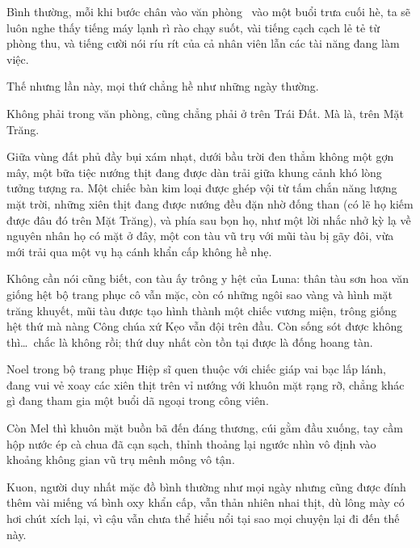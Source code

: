 \documentclass[../main.tex]{subfiles}
\begin{document}

Bình thường, mỗi khi bước chân vào văn phòng \hll\ vào một buổi trưa cuối hè, ta sẽ luôn nghe thấy tiếng máy lạnh rì rào chạy suốt, vài tiếng cạch cạch lẻ tẻ từ phòng thu, và tiếng cười nói ríu rít của cả nhân viên lẫn các tài năng đang làm việc.

Thế nhưng lần này, mọi thứ chẳng hề như những ngày thường.

Không phải trong văn phòng, cũng chẳng phải ở trên Trái Đất. Mà là, trên Mặt Trăng.

Giữa vùng đất phủ đầy bụi xám nhạt, dưới bầu trời đen thẳm không một gợn mây, một bữa tiệc nướng thịt đang được dàn trải giữa khung cảnh khó lòng tưởng tượng ra. Một chiếc bàn kim loại được ghép vội từ tấm chắn năng lượng mặt trời, những xiên thịt đang được nướng đều đặn nhờ đống than (có lẽ họ kiếm được đâu đó trên Mặt Trăng), và phía sau bọn họ, như một lời nhắc nhở kỳ lạ về nguyên nhân họ có mặt ở đây, một con tàu vũ trụ với mũi tàu bị gãy đôi, vừa mới trải qua một vụ hạ cánh khẩn cấp không hề nhẹ.

Không cần nói cũng biết, con tàu ấy trông y hệt của Luna: thân tàu sơn hoa văn giống hệt bộ trang phục cô vẫn mặc, còn có những ngôi sao vàng và hình mặt trăng khuyết, mũi tàu được tạo hình thành một chiếc vương miện, trông giống hệt thứ mà nàng Công chúa xứ Kẹo vẫn đội trên đầu. Còn sống sót được không thì\dots\ chắc là không rồi; thứ duy nhất còn tồn tại được là đống hoang tàn.

Noel trong bộ trang phục Hiệp sĩ quen thuộc với chiếc giáp vai bạc lấp lánh, đang vui vẻ xoay các xiên thịt trên vỉ nướng với khuôn mặt rạng rỡ, chẳng khác gì đang tham gia một buổi dã ngoại trong công viên.

Còn Mel thì khuôn mặt buồn bã đến đáng thương, cúi gằm đầu xuống, tay cầm hộp nước ép cà chua đã cạn sạch, thỉnh thoảng lại ngước nhìn vô định vào khoảng không gian vũ trụ mênh mông vô tận.

Kuon, người duy nhất mặc đồ bình thường như mọi ngày nhưng cũng được đính thêm vài miếng vá bình oxy khẩn cấp, vẫn thản nhiên nhai thịt, dù lông mày có hơi chút xích lại, vì cậu vẫn chưa thể hiểu nổi tại sao mọi chuyện lại đi đến thế này.
\end{document}
